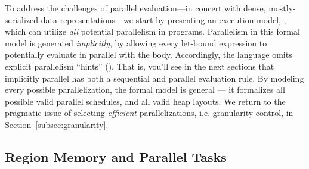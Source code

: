 \documentclass[acmsmall,acmthm=false,nonacm]{acmart}
\theoremstyle{straighttext0}
\theoremstyle{straighttext}
\newcommand{\Secref}[1]{Section~\ref{#1}}
\newcommand{\new}[1]{#1}
\begin{document}
To address the challenges of parallel evaluation---in concert with dense,
mostly-serialized data representations---we start by
presenting an execution model, \rparcalc{},
which can utilize {\em all} potential parallelism in \seqcalc{} programs.
%
Parallelism in this formal model is generated {\em implicitly},
by allowing every let-bound expression to potentially evaluate in parallel with the body.
Accordingly, the language omits explicit parallelism ``hints'' (\il{$\partup$}).
%
That is, you'll see in the next sections that implicitly parallel  has both a sequential and parallel evaluation rule.
%
%
%
By modeling every possible parallelization, the formal model is general ---
it formalizes all possible valid parallel schedules, and all valid heap layouts.
%
We return to the pragmatic issue of selecting {\em efficient} parallelizations, i.e. granularity control, in \Secref{subsec:granularity}.
%

\subsection{Region Memory and Parallel Tasks}
\label{sec:indirection-semantics-intro}
\end{document}
